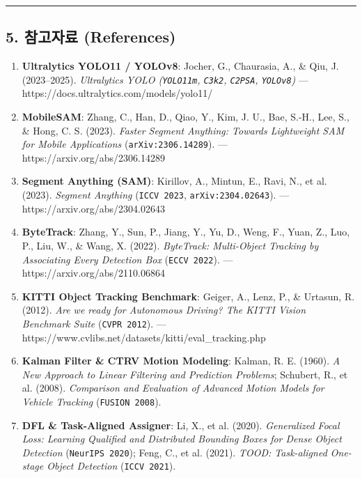 \documentclass[10.5pt,a4paper]{article}
\begin{document}
\par\noindent\rule{\textwidth}{0.4pt}\par\medskip

\subsection{5. 참고자료 (References)}

\begin{enumerate}[leftmargin=1.8em,itemsep=2pt]
\item \textbf{Ultralytics YOLO11 / YOLOv8}: Jocher, G., Chaurasia, A., \& Qiu, J. (2023--2025). \textit{Ultralytics YOLO (\texttt{YOLO11m}, \texttt{C3k2}, \texttt{C2PSA}, \texttt{YOLOv8})} --- https:\allowbreak{}/\allowbreak{}/\allowbreak{}docs.\allowbreak{}ultralytics.\allowbreak{}com/\allowbreak{}models/\allowbreak{}yolo11/\allowbreak{}
\item \textbf{MobileSAM}: Zhang, C., Han, D., Qiao, Y., Kim, J. U., Bae, S.-H., Lee, S., \& Hong, C. S. (2023). \textit{Faster Segment Anything: Towards Lightweight SAM for Mobile Applications} (\texttt{arXiv:\allowbreak{}2306.\allowbreak{}14289}).\allowbreak{} --- https:\allowbreak{}/\allowbreak{}/\allowbreak{}arxiv.\allowbreak{}org/\allowbreak{}abs/\allowbreak{}2306.\allowbreak{}14289
\item \textbf{Segment Anything (SAM)}: Kirillov, A., Mintun, E., Ravi, N., et al. (2023). \textit{Segment Anything} (\texttt{ICCV 2023}, \texttt{arXiv:\allowbreak{}2304.\allowbreak{}02643}).\allowbreak{} --- https:\allowbreak{}/\allowbreak{}/\allowbreak{}arxiv.\allowbreak{}org/\allowbreak{}abs/\allowbreak{}2304.\allowbreak{}02643
\item \textbf{ByteTrack}: Zhang, Y., Sun, P., Jiang, Y., Yu, D., Weng, F., Yuan, Z., Luo, P., Liu, W., \& Wang, X. (2022). \textit{ByteTrack: Multi-Object Tracking by Associating Every Detection Box} (\texttt{ECCV 2022}).\allowbreak{} --- https:\allowbreak{}/\allowbreak{}/\allowbreak{}arxiv.\allowbreak{}org/\allowbreak{}abs/\allowbreak{}2110.\allowbreak{}06864
\item \textbf{KITTI Object Tracking Benchmark}: Geiger, A., Lenz, P., \& Urtasun, R. (2012). \textit{Are we ready for Autonomous Driving? The KITTI Vision Benchmark Suite} (\texttt{CVPR 2012}).\allowbreak{} --- https:\allowbreak{}/\allowbreak{}/\allowbreak{}www.\allowbreak{}cvlibs.\allowbreak{}net/\allowbreak{}datasets/\allowbreak{}kitti/\allowbreak{}eval\_\allowbreak{}tracking.\allowbreak{}php
\item \textbf{Kalman Filter \& CTRV Motion Modeling}: Kalman, R. E. (1960). \textit{A New Approach to Linear Filtering and Prediction Problems}; Schubert, R., et al. (2008). \textit{Comparison and Evaluation of Advanced Motion Models for Vehicle Tracking} (\texttt{FUSION 2008}).
\item \textbf{DFL \& Task-Aligned Assigner}: Li, X., et al. (2020). \textit{Generalized Focal Loss: Learning Qualified and Distributed Bounding Boxes for Dense Object Detection} (\texttt{NeurIPS 2020}); Feng, C., et al. (2021). \textit{TOOD: Task-aligned One-stage Object Detection} (\texttt{ICCV 2021}).
\end{enumerate}
\newpage
\end{document}
